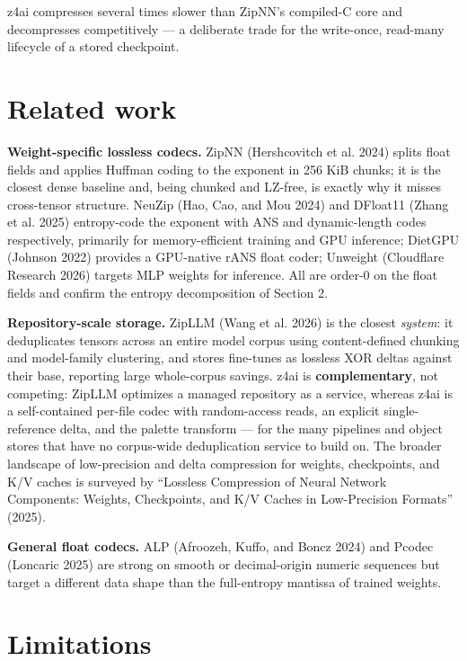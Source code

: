\documentclass[
]{article}
\begin{document}
z4ai compresses several times slower than ZipNN's compiled-C core and
decompresses competitively --- a deliberate trade for the write-once,
read-many lifecycle of a stored checkpoint.

\section{Related work}\label{related-work}

\textbf{Weight-specific lossless codecs.} ZipNN (Hershcovitch et al.
2024) splits float fields and applies Huffman coding to the exponent in
256 KiB chunks; it is the closest dense baseline and, being chunked and
LZ-free, is exactly why it misses cross-tensor structure. NeuZip (Hao,
Cao, and Mou 2024) and DFloat11 (Zhang et al. 2025) entropy-code the
exponent with ANS and dynamic-length codes respectively, primarily for
memory-efficient training and GPU inference; DietGPU (Johnson 2022)
provides a GPU-native rANS float coder; Unweight (Cloudflare Research
2026) targets MLP weights for inference. All are order-0 on the float
fields and confirm the entropy decomposition of Section 2.

\textbf{Repository-scale storage.} ZipLLM (Wang et al. 2026) is the
closest \emph{system}: it deduplicates tensors across an entire model
corpus using content-defined chunking and model-family clustering, and
stores fine-tunes as lossless XOR deltas against their base, reporting
large whole-corpus savings. z4ai is \textbf{complementary}, not
competing: ZipLLM optimizes a managed repository as a service, whereas
z4ai is a self-contained per-file codec with random-access reads, an
explicit single-reference delta, and the palette transform --- for the
many pipelines and object stores that have no corpus-wide deduplication
service to build on. The broader landscape of low-precision and delta
compression for weights, checkpoints, and K/V caches is surveyed by
{``Lossless Compression of Neural Network Components: Weights,
Checkpoints, and {K/V} Caches in Low-Precision Formats''} (2025).

\textbf{General float codecs.} ALP (Afroozeh, Kuffo, and Boncz 2024) and
Pcodec (Loncaric 2025) are strong on smooth or decimal-origin numeric
sequences but target a different data shape than the full-entropy
mantissa of trained weights.

\section{Limitations}\label{limitations}
\end{document}
